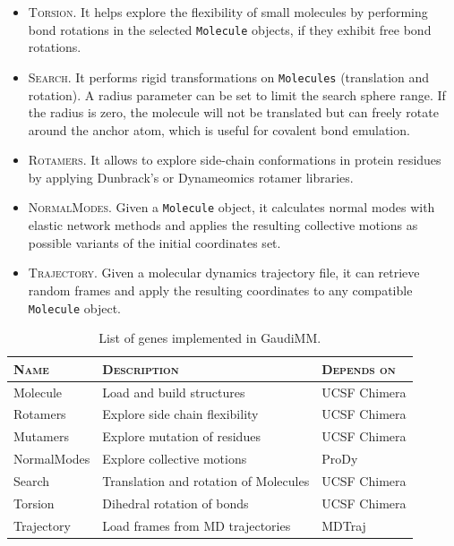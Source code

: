 \begin{itemize}
	\item \textsc{Torsion}. It helps explore the flexibility of small molecules by performing bond rotations in the selected \texttt{Molecule} objects, if they exhibit free bond rotations.

	\item \textsc{Search}. It performs rigid transformations on \texttt{Molecules} (translation and rotation). A radius parameter can be set to limit the search sphere range. If the radius is zero, the molecule will not be translated but can freely rotate around the anchor atom, which is useful for covalent bond emulation.

	\item \textsc{Rotamers}. It allows to explore side-chain conformations in protein residues by applying Dunbrack's\cite{dunbrack1993backbone} or Dynameomics\cite{scouras2011dynameomics} rotamer libraries.

	\item \textsc{NormalModes}. Given a \texttt{Molecule} object, it calculates normal modes with elastic network methods and applies the resulting collective motions as possible variants of the initial coordinates set.

	\item \textsc{Trajectory}. Given a molecular dynamics trajectory file, it can retrieve random frames and apply the resulting coordinates to any compatible \texttt{Molecule} object.
\end{itemize}


\begin{table}[hbtp]
	\caption[List of genes implemented in GaudiMM]{List of genes implemented in GaudiMM.}
	\label{table:gaudi-genes}
\footnotesize
{}%
%
%
\begin{tabularx}{\textwidth}{LMR}
\toprule
\textsc{Name} & \textsc{Description} & \textsc{Depends on} \\
\toprule
 Molecule & Load and build structures & UCSF Chimera \\
\hhline{~~~}
 Rotamers & Explore side chain flexibility & UCSF Chimera \\
\hhline{~~~}
 Mutamers & Explore mutation of residues & UCSF Chimera \\
\hhline{~~~}
 NormalModes & Explore collective motions & ProDy\cite{prody} \\
\hhline{~~~}
 Search & Translation and rotation of Molecules & UCSF Chimera \\
\hhline{~~~}
 Torsion & Dihedral rotation of bonds & UCSF Chimera \\
\hhline{~~~}
 Trajectory & Load frames from MD trajectories & MDTraj\cite{mdtraj} \\
\bottomrule
\end{tabularx}
\end{table}


